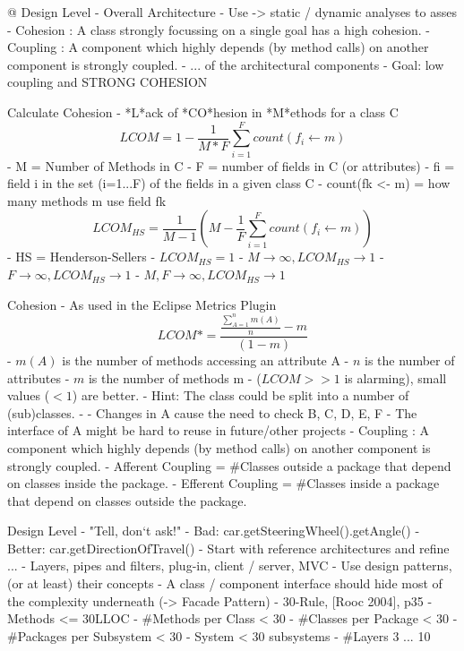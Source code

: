 \documentclass[a4paper]{article}
\begin{document}
\begin{multicols}{3}
  
  
  @ Design Level
  - Overall Architecture
  - Use -> static / dynamic analyses to asses
      - Cohesion : A class strongly focussing on a single goal has a high cohesion.
      - Coupling : A component which highly depends (by method calls) on another component is strongly coupled.
      - ... of the architectural components
  - Goal: low coupling and STRONG COHESION
  
  Calculate Cohesion
  - *L*ack of *CO*hesion in *M*ethods for a class C
      $$LCOM=1-\frac{1}{M*F} \sum_{i=1}^F count(f_i \leftarrow m)$$
      - M = Number of Methods in C
      - F = number of fields in C (or attributes)
      - fi = field i in the set (i=1...F) of the fields in a given class C
      - count(fk <- m) = how many methods m use field fk
      $$LCOM_{HS} = \frac{1}{M-1}(M-\frac{1}{F} \sum_{i=1}^F count(f_i\leftarrow m))$$
      - HS = Henderson-Sellers
  - $LCOM_{HS}=1$ %
  - $M\rightarrow \infty, LCOM_{HS}\rightarrow 1$ %
  - $F\rightarrow \infty, LCOM_{HS}\rightarrow 1$ %
  - $M, F\rightarrow \infty, LCOM_{HS}\rightarrow 1$ %
  
  
  Cohesion
  - As used in the Eclipse Metrics Plugin
      $$LCOM *= \frac{\frac{\sum_{A=1}^n m(A)}{n} -m}{(1-m)}$$
      - $m(A)$ is the number of methods accessing an attribute A
      - $n$ is the number of attributes
      - $m$ is the number of methods m
      - ($LCOM >> 1$ is alarming), small values ($<1$) are better.
      - Hint: The class could be split into a number of (sub)classes.
  - %
      - Changes in A cause the need to check B, C, D, E, F
      - The interface of A might be hard to reuse in future/other projects
      - Coupling : A component which highly depends (by method calls) on another component is strongly coupled.
  - Afferent Coupling = \#Classes outside a package that depend on classes inside the package.
  - Efferent Coupling = \#Classes inside a package that depend on classes outside the package.
  
  
  Design Level
  - "Tell, don‘t ask!"
      - Bad: car.getSteeringWheel().getAngle()
      - Better: car.getDirectionOfTravel()
  - Start with reference architectures and refine ...
      - Layers, pipes and filters, plug-in, client / server, MVC
  - Use design patterns, (or at least) their concepts
  - A class / component interface should hide most of the complexity underneath (-> Facade Pattern)
  - 30-Rule, [Rooc 2004], p35
      - Methods <= 30LLOC
      - \#Methods per Class < 30
      - \#Classes per Package < 30
      - \#Packages per Subsystem < 30
      - System < 30 subsystems
      - \#Layers 3 ... 10
  

\end{multicols}
\end{document}
